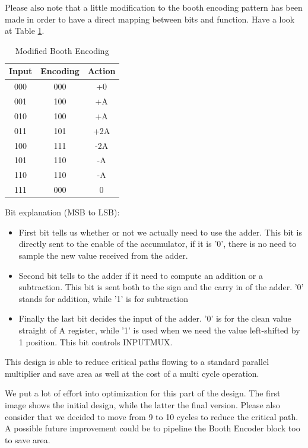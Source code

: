 \documentclass[12pt]{article}
\begin{document}
Please also note that a little modification to the booth encoding pattern has been made in order to have a direct mapping between bits and function. Have a look at Table \ref{BOOTHENC}.
\begin{table}
\begin{center}
	\begin{tabular}{ | c | c | c |}
		\hline
		\rowcolor{LimeGreen} Input & Encoding & Action \\ \hline
		000 & 000 & +0 \\ \hline
		001 & 100 & +A \\ \hline
		010 & 100 & +A \\ \hline
		011 & 101 & +2A \\ \hline
		100 & 111 & -2A \\ \hline
		101 & 110 & -A \\ \hline
		110 & 110 & -A \\ \hline
		111 & 000 & 0 \\ \hline
		
	\end{tabular}
	\caption{Modified Booth Encoding}
	\label{BOOTHENC}
\end{center}
\end{table}


Bit explanation (MSB to LSB):
\begin{itemize}
	\item First bit tells us whether or not we actually need to use the adder. This bit is directly sent to the enable of the accumulator, if it is '0', there is no need to sample the new value received from the adder.
	\item Second bit tells to the adder if it need to compute an addition or a subtraction. This bit is sent both to the sign and the carry in of the adder. '0' stands for addition, while '1' is for subtraction
	\item Finally the last bit decides the input of the adder. '0' is for the clean value straight of A register, while '1' is used when we need the value left-shifted by 1 position. This bit controls INPUTMUX.
\end{itemize}

This design is able to reduce critical paths flowing to a standard parallel multiplier and save area as well at the cost of a multi cycle operation. 

We put a lot of effort into optimization for this part of the design. The first image shows the initial design, while the latter the final version. Please also consider that we decided to move from 9 to 10 cycles to reduce the critical path.
A possible future improvement could be to pipeline the Booth Encoder block too to save area.
\end{document}
